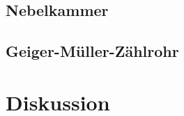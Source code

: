 \documentclass{article}
\begin{document}

\subsection{Nebelkammer}
\subsection{Geiger-Müller-Zählrohr}

\section{Diskussion}		
																								
\end{document}
